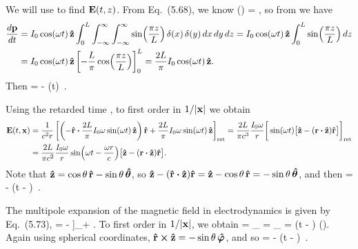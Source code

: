 \begin{solution}
	We will use  to find $\vb{E}(t, z)$.  From Eq.~(5.68), we know
	\beq
		\int \vJ(\vx) \dcx = ,
	\eeq
	so from  we have
	\begin{align*}
		\dv{\vb{p}}{t} &= I_0 \cos(\omega t) \,\vb{\hat{z}} \int_0^L \int_{-\infty}^\infty \int_{-\infty}^\infty \sin(\frac{\pi z}{L}) \,\delta(x) \,\delta(y) \dd{x} \dd{y} \dd{z}
		= I_0 \cos(\omega t) \,\vb{\hat{z}} \int_0^L \sin(\frac{\pi z}{L}) \dd{z} \\
		&= I_0 \cos(\omega t) \,\vb{\hat{z}} \left[ -\frac{L}{\pi} \cos(\frac{\pi z}{L}) \right]_0^L
		= \frac{2 L}{\pi} I_0 \cos(\omega t) \,\vb{\hat{z}}.
	\end{align*}
	Then
	\beq
		 = - \Io \omg \sin(\omg t) \,\zh.
	\eeq
	
	Using the retarded time , to first order in $1/\abs{\vb{x}}$ we obtain
	\begin{align*}
		\vE\tx &= \frac{1}{c^2 r} \left[ \left( -\rh \vdot \frac{2 L}{\pi} \Io \omg \sin(\omg t) \,\zh \right) \rh + \frac{2 L}{\pi} \Io \omg \sin(\omg t) \,\zh \right]_\ret
		= \frac{2 L}{\pi c^3} \frac{\Io \omg}{r} \bigg[ \sin(\omg t) \big[ \zh - (\vr \vdot \zh) \rh \big] \bigg]_\ret \\
		&= \frac{2 L}{\pi c^2} \frac{\Io \omg}{r} \sin(\omg t - \frac{\omg r}{c}) \big[ \zh - (\vr \vdot \zh) \rh \big].
	\end{align*}
	Note that $\vb{\hat{z}} = \cos\theta \,\vb{\hat{r}} - \sin\theta \,\boldsymbol{\hat{\theta}}$, so $\zh - (\rh \vdot \zh) \rh = \zh - \cos\tht \,\rh = -\sin\tht \,\thh$, and then
	\beq
		\vE\tx = -  \sin(\omg t - ) \sin\tht \,\thh.
	\eeq

	The multipole expansion of the magnetic field in electrodynamics is given by Eq.~(5.73),
	\beqn \label{Bfield}
		\vB\tx = - \xh \cross \left[ \dv[2]{\vp}{t} \right]_\ret + .
	\eeqn
	To first order in $1/\abs{\vb{x}}$, we obtain
	\beq
		\vB\tx =  \rh \cross {}_\ret
		=   \rh \cross {}_\ret
		=   \sin(\omg t - ) (\rh \cross \zh).
	\eeq
	Again using spherical coordinates, $\vb{\hat{r}} \cross \vb{\hat{z}} = -\sin\theta \,\boldsymbol{\hat{\varphi}}$, and so
	\beq
		\vB\tx = -  \sin(\omg t - ) \sin\tht \,\phh.
	\eeq
	\vfix
\end{solution}